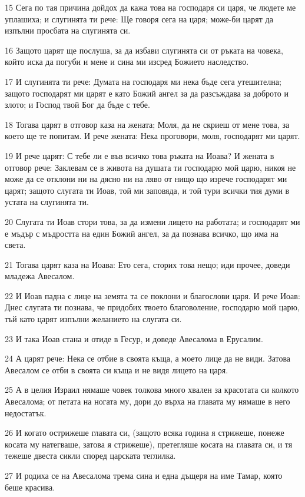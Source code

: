 \par 15 Сега по тая причина дойдох да кажа това на господаря си царя, че людете ме уплашиха; и слугинята ти рече: Ще говоря сега на царя; може-би царят да изпълни просбата на слугинята си.
\par 16 Защото царят ще послуша, за да избави слугинята си от ръката на човека, който иска да погуби и мене и сина ми изсред Божието наследство.
\par 17 И слугинята ти рече: Думата на господаря ми нека бъде сега утешителна; защото господарят ми царят е като Божий ангел за да разсъждава за доброто и злото; и Господ твой Бог да бъде с тебе.
\par 18 Тогава царят в отговор каза на жената; Моля, да не скриеш от мене това, за което ще те попитам. И рече жената: Нека проговори, моля, господарят ми царят.
\par 19 И рече царят: С тебе ли е във всичко това ръката на Иоава? И жената в отговор рече: Заклевам се в живота на душата ти господарю мой царю, никоя не може да се отклони ни на дясно ни на ляво от нищо що изрече господарят ми царят; защото слугата ти Иоав, той ми заповяда, и той тури всички тия думи в устата на слугинята ти.
\par 20 Слугата ти Иоав стори това, за да измени лицето на работата; и господарят ми е мъдър с мъдростта на един Божий ангел, за да познава всичко, що има на света.
\par 21 Тогава царят каза на Иоава: Ето сега, сторих това нещо; иди прочее, доведи младежа Авесалом.
\par 22 И Иоав падна с лице на земята та се поклони и благослови царя. И рече Иоав: Днес слугата ти познава, че придобих твоето благоволение, господарю мой царю, тъй като царят изпълни желанието на слугата си.
\par 23 И така Иоав стана и отиде в Гесур, и доведе Авесалома в Ерусалим.
\par 24 А царят рече: Нека се отбие в своята къща, а моето лице да не види. Затова Авесалом се отби в своята си къща и не видя лицето на царя.
\par 25 А в целия Израил нямаше човек толкова много хвален за красотата си колкото Авесалома; от петата на ногата му, дори до върха на главата му нямаше в него недостатък.
\par 26 И когато острижеше главата си, (защото всяка година я стрижеше, понеже косата му натегваше, затова я стрижеше), претегляше косата на главата си, и тя тежеше двеста сикли според царската теглилка.
\par 27 И родиха се на Авесалома трема сина и една дъщеря на име Тамар, която беше красива.
